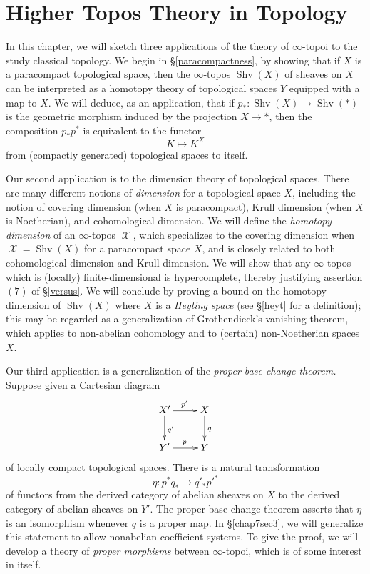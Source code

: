 \documentclass[12pt, final]{report}
\DeclareMathOperator{\Shv}{Shv}
\DeclareMathOperator{\calX}{\mathcal{X}}
\theoremstyle{definition}
\begin{document}






\chapter{Higher Topos Theory in Topology}\label{chap7}

\setcounter{theorem}{0}
\setcounter{subsection}{0}


In this chapter, we will sketch three applications of the theory of $\infty$-topoi to the study classical topology. We begin in \S \ref{paracompactness}, by showing that if $X$ is a paracompact topological space, then the $\infty$-topos $\Shv(X)$ of sheaves on $X$ can be interpreted as a homotopy theory of topological spaces $Y$ equipped with a map to $X$. We will deduce, as an application, that if $p_{\ast}: \Shv(X) \rightarrow \Shv(\ast)$ is the geometric morphism induced by the projection $X \rightarrow \ast$, then the composition $p_{\ast} p^{\ast}$ is equivalent to the functor $$K \mapsto K^X$$ from (compactly generated) topological spaces to itself.

Our  second application is to the dimension theory of topological spaces. There are many different notions of {\it dimension} for a topological space $X$, including the notion of covering dimension (when $X$ is paracompact), Krull dimension (when $X$ is Noetherian), and cohomological dimension. We will define the {\it homotopy dimension} of an $\infty$-topos $\calX$, which specializes to the covering dimension when $\calX = \Shv(X)$ for a paracompact space $X$, and is closely related to both cohomological dimension and Krull dimension. We will show that any $\infty$-topos which is (locally) finite-dimensional is hypercomplete, thereby justifying assertion $(7)$ of \S \ref{versus}. We will conclude by proving a bound on the homotopy dimension of $\Shv(X)$ where $X$ is a {\it Heyting space} (see \S \ref{heyt} for a definition); this may be regarded as a generalization of Grothendieck's vanishing theorem, which applies to non-abelian cohomology and to (certain) non-Noetherian spaces $X$.

Our third application is a generalization of the {\em proper base change theorem.}
Suppose given a Cartesian diagram
$$ \xymatrix{ X' \ar[r]^{p'} \ar[d]^{q'} & X \ar[d]^{q} \\
Y' \ar[r]^{p} & Y}$$
of locally compact topological spaces.
There is a natural transformation
$$ \eta: p^{\ast} q_{\ast} \rightarrow q'_{\ast} {p'}^{\ast}$$
of functors from the derived category of abelian sheaves on $X$ to the derived category of abelian sheaves on $Y'$. The proper base change theorem asserts that $\eta$ is an isomorphism whenever $q$ is a proper map. In \S \ref{chap7sec3}, we will generalize this statement to allow nonabelian coefficient systems. To give the proof, we will develop a theory of {\it proper morphisms} between $\infty$-topoi, which is of some interest in itself.
\end{document}
